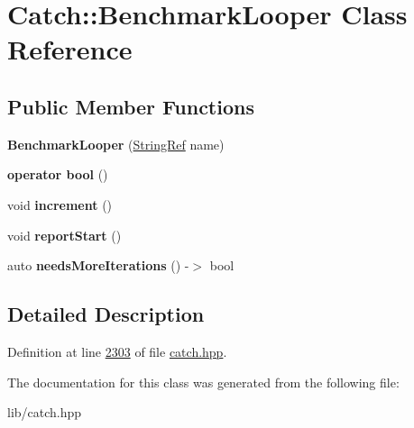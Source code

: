 \hypertarget{classCatch_1_1BenchmarkLooper}{}\section{Catch\+::Benchmark\+Looper Class Reference}
\label{classCatch_1_1BenchmarkLooper}
\subsection*{Public Member Functions}
\begin{DoxyCompactItemize}
\item 
\mbox{\label{classCatch_1_1BenchmarkLooper_ab9ba6397306a70082f39e63a8a71bde6}} 
{\bfseries Benchmark\+Looper} (\mbox{\hyperlink{classCatch_1_1StringRef}{String\+Ref}} name)
\item 
\mbox{\label{classCatch_1_1BenchmarkLooper_a54da41bada9da038dc05faf41d746765}} 
{\bfseries operator bool} ()
\item 
\mbox{\label{classCatch_1_1BenchmarkLooper_a210552aff5b19408637444d4bb35d59c}} 
void {\bfseries increment} ()
\item 
\mbox{\label{classCatch_1_1BenchmarkLooper_a0697d1b266112b110edf2025b82c4e77}} 
void {\bfseries report\+Start} ()
\item 
\mbox{\label{classCatch_1_1BenchmarkLooper_a97bd944521f519b1593a5d1d2f9998fa}} 
auto {\bfseries needs\+More\+Iterations} () -\/$>$ bool
\end{DoxyCompactItemize}


\subsection{Detailed Description}


Definition at line \mbox{\hyperlink{catch_8hpp_source_l02303}{2303}} of file \mbox{\hyperlink{catch_8hpp_source}{catch.\+hpp}}.



The documentation for this class was generated from the following file\+:\begin{DoxyCompactItemize}
\item 
lib/catch.\+hpp\end{DoxyCompactItemize}

